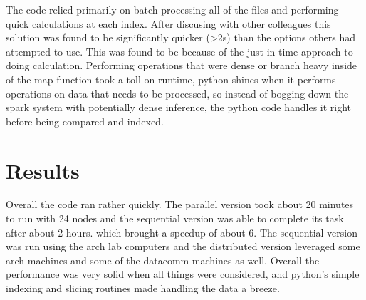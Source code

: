 \documentclass[11pt]{article}
\begin{document}
The code relied primarily on batch processing all of the files and performing quick calculations at each index. After discusing
with other colleagues this solution was found to be significantly quicker (>2s) than the options others had attempted to use. This
was found to be because of the just-in-time approach to doing calculation. Performing operations that were dense or branch heavy
inside of the map function took a toll on runtime, python shines when it performs operations on data that needs to be processed,
so instead of bogging down the spark system with potentially dense inference, the python code handles it right before being
compared and indexed.

\section{Results}
Overall the code ran rather quickly. The parallel version took about 20 minutes to run with 24 nodes and the sequential version
was able to complete its task after about 2 hours. which brought a speedup of about 6. The sequential version was run using the
arch lab computers and the distributed version leveraged some arch machines and some of the datacomm machines as well. Overall
the performance was very solid when all things were considered, and python's simple indexing and slicing routines made handling
the data a breeze.
\end{document}
